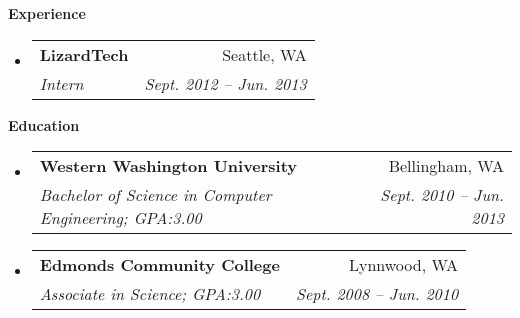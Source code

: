 \documentclass[letterpaper,11pt]{article}
\makeatletter
\newcommand{\resheading}[1]{{\large \colorbox{mygrey}{\begin{minipage}{\textwidth}{\textbf{#1 \vphantom{p\^{E}}}}\end{minipage}}}}
\newcommand{\ressubheading}[4]{
\begin{tabular*}{6.5in}{l@{\extracolsep{\fill}}r}
		\textbf{#1} & #2 \\
		\textit{#3} & \textit{#4} \\
\end{tabular*}\vspace{-6pt}}
\makeatother
\begin{document}
\resheading{Experience}
	\begin{itemize}
		\item 
			\ressubheading{{LizardTech }}{Seattle, WA}{Intern}{Sept. 2012 -- Jun. 2013}


	\end{itemize}  %
	
\resheading{Education}
	\begin{itemize}
		\item
			\ressubheading{{Western Washington University}}{Bellingham, WA}{{Bachelor of Science in Computer Engineering}; {GPA:3.00}}{Sept. 2010 -- Jun. 2013}
			
		\item
			\ressubheading{{Edmonds Community College}}{Lynnwood, WA}{{Associate in Science}; {GPA:3.00}}{Sept. 2008 -- Jun. 2010}

	\end{itemize} %
\end{document}
